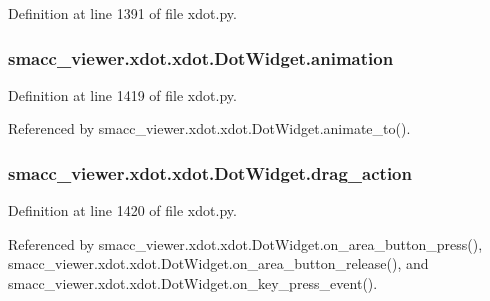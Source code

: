 Definition at line 1391 of file xdot.\+py.

\subsubsection[{\texorpdfstring{animation}{animation}}]{\setlength{\rightskip}{0pt plus 5cm}smacc\+\_\+viewer.\+xdot.\+xdot.\+Dot\+Widget.\+animation}\hypertarget{classsmacc__viewer_1_1xdot_1_1xdot_1_1DotWidget_a128977c220045cc07091eb6fbd5846cc}{}\label{classsmacc__viewer_1_1xdot_1_1xdot_1_1DotWidget_a128977c220045cc07091eb6fbd5846cc}


Definition at line 1419 of file xdot.\+py.



Referenced by smacc\+\_\+viewer.\+xdot.\+xdot.\+Dot\+Widget.\+animate\+\_\+to().

\subsubsection[{\texorpdfstring{drag\+\_\+action}{drag_action}}]{\setlength{\rightskip}{0pt plus 5cm}smacc\+\_\+viewer.\+xdot.\+xdot.\+Dot\+Widget.\+drag\+\_\+action}\hypertarget{classsmacc__viewer_1_1xdot_1_1xdot_1_1DotWidget_a767a18a13a9581e3e7afd20bf0842856}{}\label{classsmacc__viewer_1_1xdot_1_1xdot_1_1DotWidget_a767a18a13a9581e3e7afd20bf0842856}


Definition at line 1420 of file xdot.\+py.



Referenced by smacc\+\_\+viewer.\+xdot.\+xdot.\+Dot\+Widget.\+on\+\_\+area\+\_\+button\+\_\+press(), smacc\+\_\+viewer.\+xdot.\+xdot.\+Dot\+Widget.\+on\+\_\+area\+\_\+button\+\_\+release(), and smacc\+\_\+viewer.\+xdot.\+xdot.\+Dot\+Widget.\+on\+\_\+key\+\_\+press\+\_\+event().

